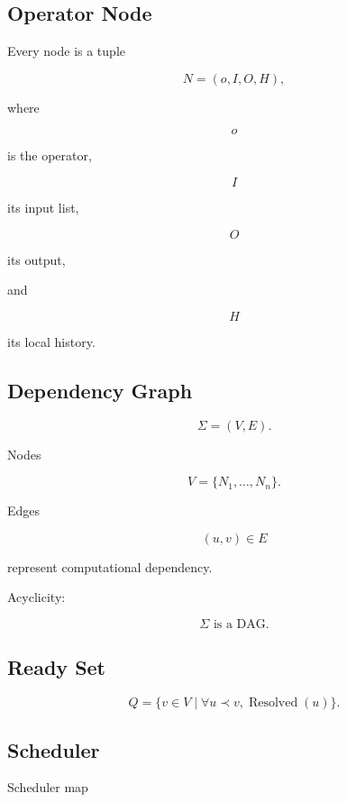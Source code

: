 \documentclass[12pt,oneside]{article}
\theoremstyle{definition}
\theoremstyle{remark}
\begin{document}
\subsection*{Operator Node}

Every node is a tuple

\[
N
=
(o,I,O,H),
\]

where

\[
o
\]

is the operator,

\[
I
\]

its input list,

\[
O
\]

its output,

and

\[
H
\]

its local history.

\subsection*{Dependency Graph}

\[
\Sigma
=
(V,E).
\]

Nodes

\[
V
=
\{N_1,\ldots,N_n\}.
\]

Edges

\[
(u,v)
\in
E
\]

represent computational dependency.

Acyclicity:

\[
\Sigma
\text{ is a DAG}.
\]

\subsection*{Ready Set}

\[
Q
=
\{
v
\in
V
\mid
\forall
u\prec v,
\operatorname{Resolved}(u)
\}.
\]

\subsection*{Scheduler}

Scheduler map
\end{document}
